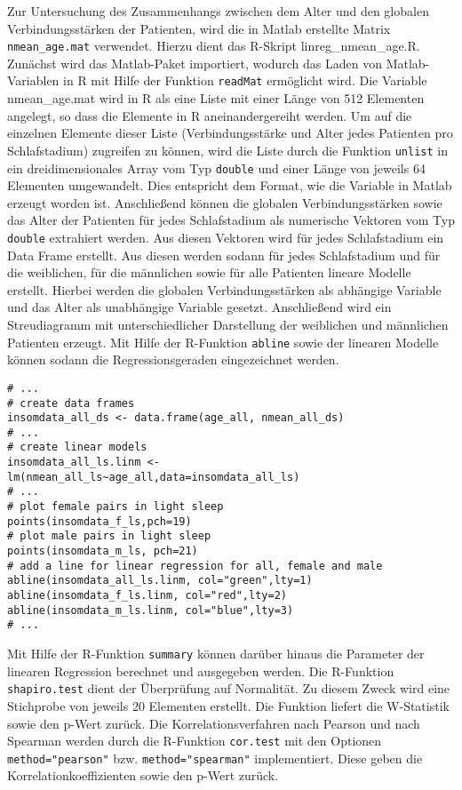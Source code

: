 Zur Untersuchung des Zusammenhangs zwischen dem Alter und den globalen Verbindungsstärken der Patienten, wird die in Matlab erstellte Matrix \texttt{nmean\_age.mat} verwendet. Hierzu dient das R-Skript linreg\_nmean\_age.R. Zunächst wird das Matlab-Paket importiert, wodurch das Laden von Matlab-Variablen in R mit Hilfe der Funktion \texttt{readMat} ermöglicht wird. Die Variable nmean\_age.mat wird in R als eine Liste mit einer Länge von 512 Elementen angelegt, so dass die Elemente in R aneinandergereiht werden. Um auf die einzelnen Elemente dieser Liste (Verbindungsstärke und Alter jedes Patienten pro Schlafstadium) zugreifen zu können, wird die Liste durch die Funktion \texttt{unlist} in ein dreidimensionales Array vom Typ \texttt{double} und einer Länge von jeweils 64 Elementen umgewandelt. Dies entspricht dem Format, wie die Variable in Matlab erzeugt worden ist. Anschließend können die globalen Verbindungsstärken sowie das Alter der Patienten für jedes Schlafstadium als numerische Vektoren vom Typ \texttt{double} extrahiert werden. Aus diesen Vektoren wird für jedes Schlafstadium ein Data Frame erstellt. Aus diesen werden sodann für jedes Schlafstadium und für die weiblichen, für die männlichen sowie für alle Patienten lineare Modelle erstellt. Hierbei werden die globalen Verbindungsstärken als abhängige Variable und das Alter als unabhängige Variable gesetzt. Anschließend wird ein Streudiagramm mit unterschiedlicher Darstellung der weiblichen und männlichen Patienten erzeugt. Mit Hilfe der R-Funktion \texttt{abline} sowie der linearen Modelle können sodann die Regressionsgeraden eingezeichnet werden.\\

\begin{lstlisting}[caption={Erstellung eines Streudiagramms und Einzeichnung der Regressionslinien in dem Skript linreg\_nmean\_age.R}, label={lst:nmean_age}]
# ...
# create data frames
insomdata_all_ds <- data.frame(age_all, nmean_all_ds)
# ...
# create linear models
insomdata_all_ls.linm <- lm(nmean_all_ls~age_all,data=insomdata_all_ls)
# ...
# plot female pairs in light sleep
points(insomdata_f_ls,pch=19)
# plot male pairs in light sleep
points(insomdata_m_ls, pch=21)
# add a line for linear regression for all, female and male 
abline(insomdata_all_ls.linm, col="green",lty=1)
abline(insomdata_f_ls.linm, col="red",lty=2)
abline(insomdata_m_ls.linm, col="blue",lty=3)
# ...
\end{lstlisting}

Mit Hilfe der R-Funktion \texttt{summary} können darüber hinaus die Parameter der linearen Regression berechnet und ausgegeben werden. Die R-Funktion \texttt{shapiro.test} dient der Überprüfung auf Normalität. Zu diesem Zweck wird eine Stichprobe von jeweils 20 Elementen erstellt. Die Funktion liefert die W-Statistik sowie den p-Wert zurück. Die Korrelationsverfahren nach Pearson und nach Spearman werden durch die R-Funktion \texttt{cor.test} mit den Optionen \texttt{method="pearson"} bzw. \texttt{method="spearman"} implementiert. Diese geben die Korrelationkoeffizienten sowie den p-Wert zurück.



